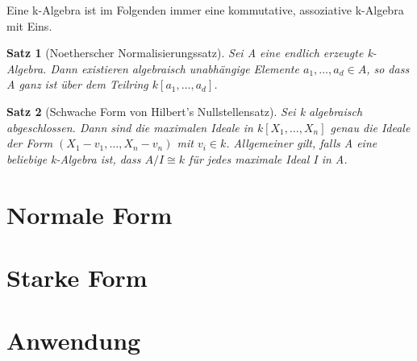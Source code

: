 \documentclass{article}
\newtheorem{satz}{Satz}
\begin{document}
	Eine k-Algebra ist im Folgenden immer eine kommutative, assoziative
	k-Algebra mit Eins.

	\begin{satz}[Noetherscher Normalisierungssatz]
	Sei A eine endlich erzeugte k-Algebra. Dann existieren algebraisch
	unabhängige Elemente \(a_1, \ldots, a_d \in A\), so dass A ganz ist über
	dem Teilring \(k[a_1, \ldots, a_d]\).
	\end{satz}

	\begin{satz}[Schwache Form von Hilbert's Nullstellensatz]
	Sei k algebraisch abgeschlossen. Dann sind die maximalen Ideale in
	\(k[X_1, \ldots, X_n]\) genau die Ideale der Form \((X_1-v_1,\ldots,
	X_n-v_n)\) mit \(v_i \in k\). Allgemeiner gilt, falls A eine beliebige
	k-Algebra ist, dass \(A/I \cong k\) für jedes maximale Ideal I in A.
	\end{satz}


\section{Normale Form}
\section{Starke Form}
\section{Anwendung}
\end{document}
